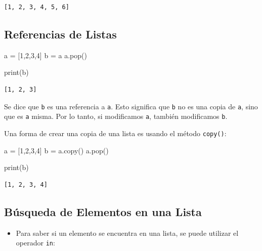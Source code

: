 \documentclass[
  letterpaper,
  DIV=11,
  numbers=noendperiod]{scrreprt}
\newenvironment{Shaded}{\begin{snugshade}}{\end{snugshade}}
\newcommand{\BuiltInTok}[1]{\textcolor[rgb]{0.00,0.23,0.31}{#1}}
\newcommand{\DecValTok}[1]{\textcolor[rgb]{0.68,0.00,0.00}{#1}}
\newcommand{\NormalTok}[1]{\textcolor[rgb]{0.00,0.23,0.31}{#1}}
\newcommand{\OperatorTok}[1]{\textcolor[rgb]{0.37,0.37,0.37}{#1}}
\providecommand{\tightlist}{%
  \setlength{\itemsep}{0pt}\setlength{\parskip}{0pt}}\usepackage{longtable,booktabs,array}
\begin{document}
\begin{verbatim}
[1, 2, 3, 4, 5, 6]
\end{verbatim}

\subsection{Referencias de Listas}\label{referencias-de-listas}

\begin{Shaded}
\begin{Highlighting}[]
\NormalTok{a }\OperatorTok{=}\NormalTok{ [}\DecValTok{1}\NormalTok{,}\DecValTok{2}\NormalTok{,}\DecValTok{3}\NormalTok{,}\DecValTok{4}\NormalTok{]}
\NormalTok{b }\OperatorTok{=}\NormalTok{ a}
\NormalTok{a.pop()}

\BuiltInTok{print}\NormalTok{(b)}
\end{Highlighting}
\end{Shaded}

\begin{verbatim}
[1, 2, 3]
\end{verbatim}

Se dice que \texttt{b} es una referencia a \texttt{a}. Esto significa
que \texttt{b} no es una copia de \texttt{a}, sino que es \texttt{a}
misma. Por lo tanto, si modificamos \texttt{a}, también modificamos
\texttt{b}.

Una forma de crear una copia de una lista es usando el método
\texttt{copy()}:

\begin{Shaded}
\begin{Highlighting}[]
\NormalTok{a }\OperatorTok{=}\NormalTok{ [}\DecValTok{1}\NormalTok{,}\DecValTok{2}\NormalTok{,}\DecValTok{3}\NormalTok{,}\DecValTok{4}\NormalTok{]}
\NormalTok{b }\OperatorTok{=}\NormalTok{ a.copy()}
\NormalTok{a.pop()}

\BuiltInTok{print}\NormalTok{(b)}
\end{Highlighting}
\end{Shaded}

\begin{verbatim}
[1, 2, 3, 4]
\end{verbatim}

\subsection{Búsqueda de Elementos en una
Lista}\label{buxfasqueda-de-elementos-en-una-lista}

\begin{itemize}
\tightlist
\item
  Para saber si un elemento se encuentra en una lista, se puede utilizar
  el operador \texttt{in}:
\end{itemize}
\end{document}
